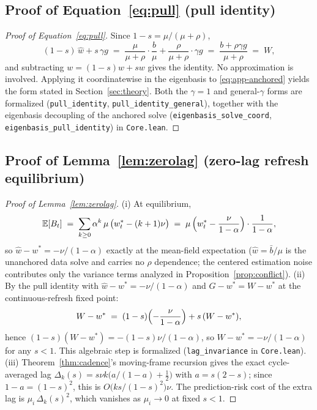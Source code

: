 \subsection{Proof of Equation~\eqref{eq:pull} (pull identity)}
\label{app:proof-pull}



\begin{proof}[Proof of Equation~\eqref{eq:pull}]
Since $1 - s = \mu/(\mu + \rho)$,
\[
  (1 - s)\,\widehat w + s\,\gamma g
  \;=\; \frac{\mu}{\mu + \rho}\cdot\frac{b}{\mu}
        + \frac{\rho}{\mu + \rho}\cdot \gamma g
  \;=\; \frac{b + \rho \gamma g}{\mu + \rho}
  \;=\; W,
\]
and subtracting $w = (1-s)w + s w$ gives the identity.
No approximation is involved.
Applying it coordinatewise in the eigenbasis to \eqref{eq:app-anchored} yields the form stated in Section~\ref{sec:theory}.
Both the $\gamma = 1$ and general-$\gamma$ forms are formalized (\texttt{pull\_identity}, \texttt{pull\_identity\_general}), together with the eigenbasis decoupling of the anchored solve (\texttt{eigenbasis\_solve\_coord}, \texttt{eigenbasis\_pull\_identity}) in \texttt{Core.lean}.
\end{proof}

\subsection{Proof of Lemma~\ref{lem:zerolag} (zero-lag refresh equilibrium)}
\label{app:proof-tracking}



\begin{proof}[Proof of Lemma~\ref{lem:zerolag}]
(i) At equilibrium,
\[
  \mathbb{E}[B_t]
  \;=\; \sum_{k \ge 0} \alpha^k\, \mu\,\bigl(w^*_t - (k+1)\nu\bigr)
  \;=\; \mu\,\Bigl(w^*_t - \frac{\nu}{1-\alpha}\Bigr)\cdot\frac{1}{1-\alpha},
\]
so $\widehat w - w^* = -\nu/(1-\alpha)$ exactly at the mean-field expectation ($\widehat w = \bar b/\mu$ is the unanchored data solve and carries no $\rho$ dependence; the centered estimation noise contributes only the variance terms analyzed in Proposition~\ref{prop:conflict}).
(ii) By the pull identity with $\widehat w - w^* = -\nu/(1-\alpha)$ and $G - w^* = W - w^*$ at the continuous-refresh fixed point:
\[
  W - w^* \;=\; (1 - s)\Bigl(-\frac{\nu}{1-\alpha}\Bigr) + s\,(W - w^*),
\]
hence $(1 - s)(W - w^*) = -(1-s)\nu/(1-\alpha)$, so $W - w^* = -\nu/(1-\alpha)$ for any $s < 1$.
This algebraic step is formalized (\texttt{lag\_invariance} in \texttt{Core.lean}).
(iii) Theorem~\ref{thm:cadence}'s moving-frame recursion gives the exact cycle-averaged lag $\Delta_k(s) = s\nu k\bigl(a/(1-a)+\tfrac12\bigr)$ with $a=s(2-s)$; since $1-a=(1-s)^2$, this is $O\bigl(k s/(1-s)^2\bigr)\nu$.
The prediction-risk cost of the extra lag is $\mu_i\,\Delta_k(s)^2$, which vanishes as $\mu_i \to 0$ at fixed $s < 1$.
\end{proof}

